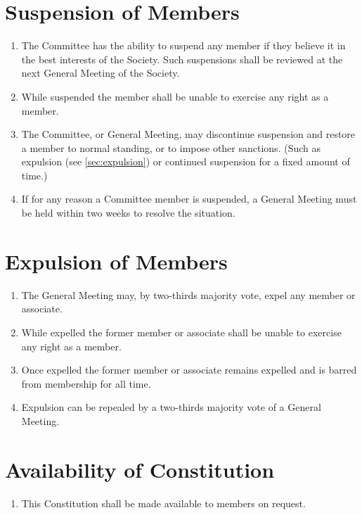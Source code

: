 \documentclass[a4paper]{article}
\begin{document}
\section{Suspension of Members} \label{sec:member_suspension}
\begin{enumerate}
    \item The Committee has the ability to suspend any member if they believe it in the best interests of the Society. Such suspensions shall be reviewed at the next General Meeting of the Society.
    \item While suspended the member shall be unable to exercise any right as a member. 
    \item The Committee, or General Meeting, may discontinue suspension and restore a member to normal standing, or to impose other sanctions. (Such as expulsion (see \cref{sec:expulsion}) or continued suspension for a fixed amount of time.)
    \item \label{committee_suspended} If for any reason a Committee member is suspended, a General Meeting must be held within two weeks to resolve the situation.
\end{enumerate}


\section{Expulsion of Members\label{sec:expulsion}}
\begin{enumerate}
    \item The General Meeting may, by two-thirds majority vote, expel any member or associate.
    \item While expelled the former member or associate shall be unable to exercise any right as a member. 
    \item Once expelled the former member or associate remains expelled and is barred from membership for all time.
    \item Expulsion can be repealed by a two-thirds majority vote of a General Meeting.
\end{enumerate}


\section{Availability of Constitution}
\begin{enumerate}
	\item This Constitution shall be made available to members on request.
\end{enumerate}
\end{document}
